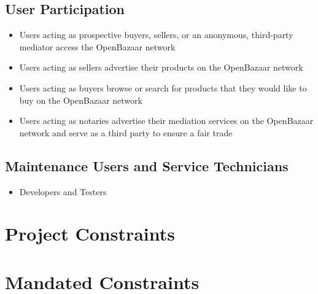\documentclass{article}
\begin{document}
\subsection{User Participation}
\begin{itemize}
\item 
Users acting as prospective buyers, sellers, or an anonymous, third-party mediator access the OpenBazaar network		

\item
Users acting as sellers advertise their products on the OpenBazaar network

\item
Users acting as buyers browse or search for products that they would like to buy on the OpenBazaar network

\item
Users acting as notaries advertise their mediation services on the OpenBazaar network and serve as a third party to ensure a fair trade
\end{itemize}

\subsection{Maintenance Users and Service Technicians}
\begin{itemize}
\item
Developers and Testers
\end{itemize}

\section*{Project Constraints}

\section{Mandated Constraints}
\end{document}
